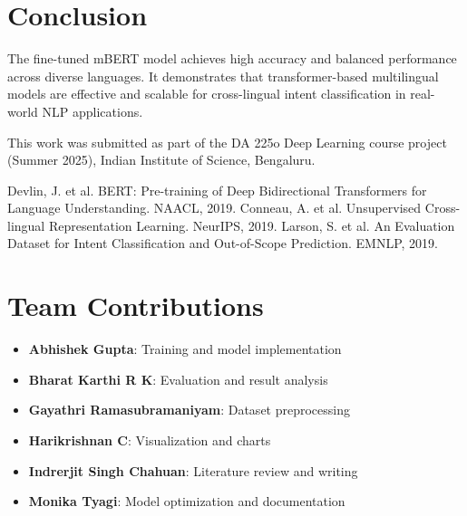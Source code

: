 \documentclass{ecai}
\begin{document}
\section{Conclusion}
The fine-tuned mBERT model achieves high accuracy and balanced performance across diverse languages. It demonstrates that transformer-based multilingual models are effective and scalable for cross-lingual intent classification in real-world NLP applications.

\ack This work was submitted as part of the DA 225o Deep Learning course project (Summer 2025), Indian Institute of Science, Bengaluru.


\begin{thebibliography}{}
\bibitem{} Devlin, J. et al. BERT: Pre-training of Deep Bidirectional Transformers for Language Understanding. NAACL, 2019.
\bibitem{} Conneau, A. et al. Unsupervised Cross-lingual Representation Learning. NeurIPS, 2019.
\bibitem{} Larson, S. et al. An Evaluation Dataset for Intent Classification and Out-of-Scope Prediction. EMNLP, 2019.
\end{thebibliography}

\newpage
\section*{Team Contributions}
\begin{itemize}
\item \textbf{Abhishek Gupta}: Training and model implementation
\item \textbf{Bharat Karthi R K}: Evaluation and result analysis
\item \textbf{Gayathri Ramasubramaniyam}: Dataset preprocessing
\item \textbf{Harikrishnan C}: Visualization and charts
\item \textbf{Indrerjit Singh Chahuan}: Literature review and writing
\item \textbf{Monika Tyagi}: Model optimization and documentation
\end{itemize}
\end{document}
